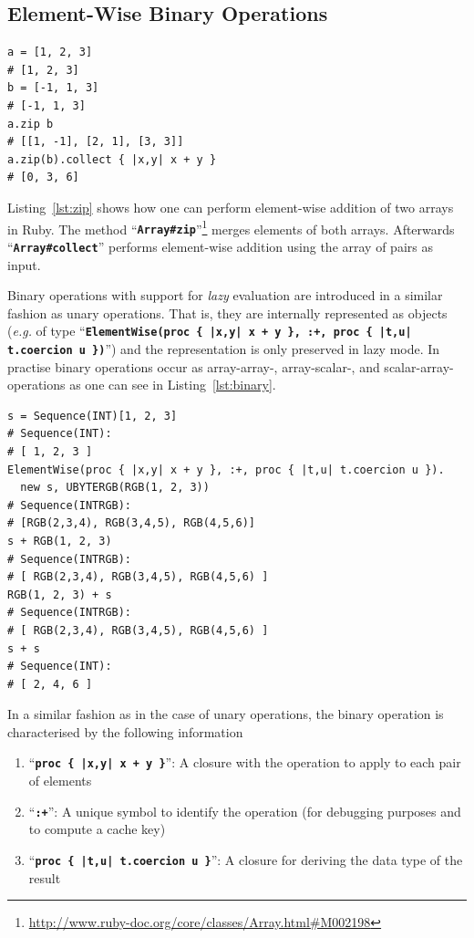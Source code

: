 \documentclass[12pt,a4paper,oneside,openright]{book}
\newcommand{\eg}{\emph{e.g.} }
\newcommand{\Ie}{That is, }
\newcommand{\lst}[1]{Listing~\ref{lst:#1}}
\newcommand{\code}[1]{``\texttt{\textbf{\textcolor{codegray}{\small{#1}}}}''}
\begin{document}
\begin{CJK}{UTF8}{}
\subsection{Element-Wise Binary Operations}\label{cha:binary}
\lstset{language=Ruby,frame=single,numbers=none}
\begin{lstlisting}[float=htbp,caption={Element-wise binary operations using \code{Array\#collect} and \code{Array\#zip}},escapechar=\$,label=lst:zip]
a = [1, 2, 3]
# [1, 2, 3]
b = [-1, 1, 3]
# [-1, 1, 3]
a.zip b
# [[1, -1], [2, 1], [3, 3]]
a.zip(b).collect { |x,y| x + y }
# [0, 3, 6]
\end{lstlisting}
\lst{zip} shows how one can perform element-wise addition of two arrays in Ruby. The method \code{Array\#zip}\footnote{\url{http://www.ruby-doc.org/core/classes/Array.html\#M002198}} merges elements of both arrays. Afterwards \code{Array\#collect} performs element-wise addition using the array of pairs as input.

Binary operations with support for \emph{lazy} evaluation are introduced in a similar fashion as unary operations. \Ie they are internally represented as objects (\eg of type \code{ElementWise(proc \{ |x,y| x + y \}, :+, proc \{ |t,u| t.coercion u \})}) and the representation is only preserved in lazy mode. In practise binary operations occur as array-array-, array-scalar-, and scalar-array-operations as one can see in \lst{binary}.
\lstset{language=Ruby,frame=single,numbers=none}
\begin{lstlisting}[float=htbp,caption={Internal representation of binary operations},escapechar=\$,label=lst:binary]
s = Sequence(INT)[1, 2, 3]
# Sequence(INT):
# [ 1, 2, 3 ]
ElementWise(proc { |x,y| x + y }, :+, proc { |t,u| t.coercion u }).
  new s, UBYTERGB(RGB(1, 2, 3))
# Sequence(INTRGB):
# [RGB(2,3,4), RGB(3,4,5), RGB(4,5,6)]
s + RGB(1, 2, 3)
# Sequence(INTRGB):
# [ RGB(2,3,4), RGB(3,4,5), RGB(4,5,6) ]
RGB(1, 2, 3) + s
# Sequence(INTRGB):
# [ RGB(2,3,4), RGB(3,4,5), RGB(4,5,6) ]
s + s
# Sequence(INT):
# [ 2, 4, 6 ]
\end{lstlisting}
In a similar fashion as in the case of unary operations, the binary operation is characterised by the following information
\begin{enumerate}
\item \code{proc \{ |x,y| x + y \}}: A closure with the operation to apply to each pair of elements
\item \code{:+}: A unique symbol to identify the operation (for debugging purposes and to compute a cache key)
\item \code{proc \{ |t,u| t.coercion u \}}: A closure for deriving the data type of the result
\end{enumerate}


\end{CJK}
\end{document}
